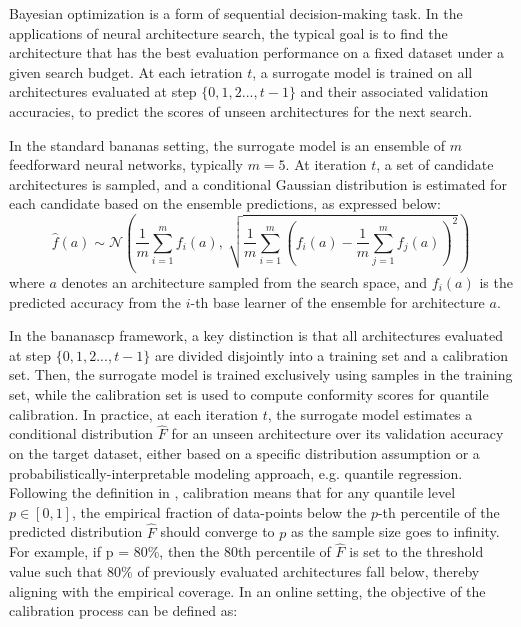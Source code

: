 \documentclass[a4paper,oneside,bibliography=totoc]{scrbook}
\begin{document}
{{\begin{algorithm}[htbp]
\begin{algorithmic}[1]
{\begin{enumerate}
{			\item Denote $a_{t}$ as the candidate architecture with maximum $\myfunc{\phi(a)}$; evaluate $\myfunc{f(a_{t})}$.
			\item $\mathcal{A}_{t} \leftarrow{\mathcal{A}_{t-1} \cup \{{a_{t}\}}$
		\end{enumerate}
    \ENDFOR 
    \STATE \textbf{Output:} $a^{*}=\operatorname*{argmin}_{t=1,...,T} f(a_{t})$    
  \end{algorithmic}
  \end{algorithm}

Bayesian optimization is a form of sequential decision-making task. In the applications of neural architecture search, the typical goal is to find the architecture that has the best evaluation performance on a fixed dataset under a given search budget. At each ietration $t$, a surrogate model is trained on all architectures evaluated at step $\{0, 1, 2..., t-1\}$ and their associated validation accuracies, to predict the scores of unseen architectures for the next search.

In the standard \gls{bananas} setting, the surrogate model is an ensemble of $m$ feedforward neural networks, typically $m=5$. At iteration $t$, a set of candidate architectures is sampled, and a conditional Gaussian distribution is estimated for each candidate based on the ensemble predictions, as expressed below:
\begin{equation}
\hat{f}(a) \sim \mathcal{N} \left( 
\frac{1}{m} \sum_{i=1}^{m} f_i(a),\ 
\sqrt{\frac{1}{m} \sum_{i=1}^{m} \left(f_i(a) - \frac{1}{m} \sum_{j=1}^{m} f_j(a) \right)^2}
\right)
\label{eq:ensemble_gaussian}
\end{equation}
\noindent
where $a$ denotes an architecture sampled from the search space, and $f_i(a)$ is the predicted accuracy from the $i$-th base learner of the ensemble for architecture $a$.

In the \gls{bananascp} framework, a key distinction is that all architectures evaluated at step $\{0, 1, 2..., t-1\}$ are divided disjointly into a training set and a calibration set. Then, the surrogate model is trained exclusively using samples in the training set, while the calibration set is used to compute conformity scores for quantile calibration. In practice, at each iteration $t$, the surrogate model estimates a conditional distribution $\hat{F}$ for an unseen architecture over its validation accuracy on the target dataset, either based on a specific distribution assumption or a probabilistically-interpretable modeling approach, e.g. quantile regression. Following the definition in \cite{deshpande2024online, pmlr-v80-kuleshov18a}, calibration means that for any quantile level $p\in [0, 1]$, the empirical fraction of data-points below the $p$-th percentile of the predicted distribution $\hat{F}$ should converge to $p$ as the sample size goes to infinity. For example, if p = 80\%, then the 80th percentile of $\hat{F}$ is set to the threshold value such that 80\% of previously evaluated architectures fall below, thereby aligning with the empirical coverage. In an online setting, the objective of the calibration process can be defined as:

}}
\end{document}
